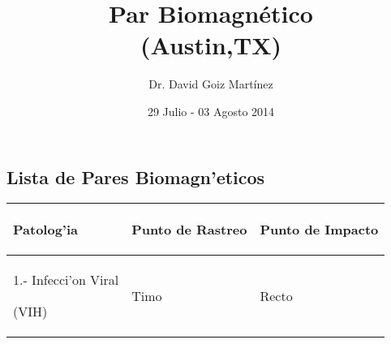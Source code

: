 \documentclass[openany, oneside,]{book}
\begin{document}
\title {\Huge Par Biomagn\'etico \\ (Austin,TX)}
\author{\Large Dr. David Goiz Mart\'inez\\}

\date{\Large 29 Julio - 03 Agosto 2014}


\maketitle

\begin{center}
\subsection*{Lista de Pares Biomagn'eticos}

\begin{tabular}{|p{5cm}|p{3.5cm}|p{3.5cm}|}\hline

\bf \begin{center}
Patolog'ia
\end{center} & \bf\begin{center}
 Punto de Rastreo
\end{center} & \bf \begin{center}
Punto de Impacto
\end{center} \\\hline

\begin{center}
1.- Infecci'on Viral
 \par (VIH)\end{center} & \centering \begin{center}
 Timo
 \end{center} & {\centering \begin{center}
 Recto
 \end{center}} \\\hline

\end{tabular}
\end{center}
\end{document}
